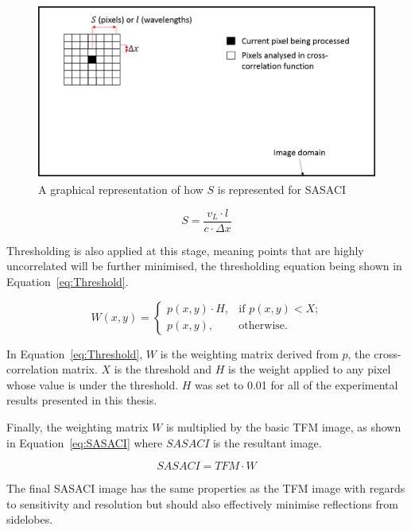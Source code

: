 \begin{figure}[htb]
\centering
		\includegraphics[width=\textwidth]{sacS1.png}
		\caption{A graphical representation of how $S$ is represented for SASACI}
		\label{fig:sasaci_S}
\end{figure}

\begin{equation}\label{eq:CalcA}
S = \frac{v_L \cdot l}{c \cdot \Delta x}
\end{equation}

Thresholding is also applied at this stage, meaning points that are highly uncorrelated will be further minimised, the thresholding equation being shown in Equation~\ref{eq:Threshold}.

\begin{equation} \label{eq:Threshold}
W(x,y) = \begin{cases}
		p(x,y) \cdot{H} , & \text{if }p(x,y) < X\text{;}\\
		p(x,y), & \text{otherwise}.
		\end{cases}
\end{equation}

In Equation~\ref{eq:Threshold}, $W$ is the weighting matrix derived from $p$, the cross-correlation matrix. $X$ is the threshold and $H$ is the weight applied to any pixel whose value is under the threshold. $H$ was set to 0.01 for all of the experimental results presented in this thesis.

Finally, the weighting matrix $W$ is multiplied by the basic TFM image, as shown in Equation~\ref{eq:SASACI} where $SASACI$ is the resultant image.

\begin{equation}\label{eq:SASACI}
SASACI = TFM \cdot W
\end{equation}

 The final SASACI image has the same properties as the TFM image with regards to sensitivity and resolution but should also effectively minimise reflections from sidelobes.

